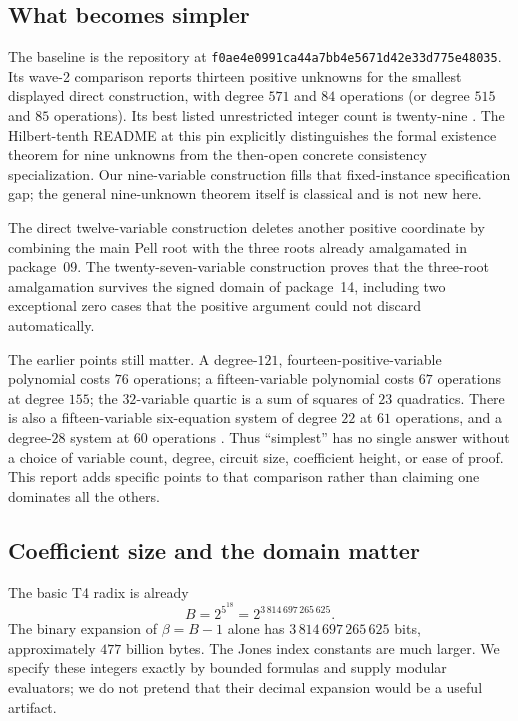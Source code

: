 \documentclass[11pt,a4paper]{article}
\theoremstyle{remark}
\newcommand{\pin}{\texttt{f0ae4e0991ca44a7bb4e5671d42e33d775e48035}}
\begin{document}
\subsection{What becomes simpler}

The baseline is the repository at \pin.  Its wave-2 comparison
\cite{collection} reports thirteen positive unknowns for the smallest
displayed direct construction, with degree $571$ and $84$ operations
(or degree $515$ and $85$ operations).  Its best listed unrestricted
integer count is twenty-nine \cite{integer29}.  The Hilbert-tenth README
at this pin explicitly distinguishes the formal existence theorem for
nine unknowns from the then-open concrete consistency specialization.
Our nine-variable construction fills that fixed-instance specification
gap; the general nine-unknown theorem itself is classical \cite{jones1982}
and is not new here.

The direct twelve-variable construction deletes another positive
coordinate by combining the main Pell root with the three roots already
amalgamated in package~09.  The twenty-seven-variable construction proves
that the three-root amalgamation survives the signed domain of
package~14, including two exceptional zero cases that the positive
argument could not discard automatically.

The earlier points still matter.  A degree-$121$, fourteen-positive-variable
polynomial costs $76$ operations; a fifteen-variable polynomial costs
$67$ operations at degree $155$; the $32$-variable quartic is a sum of
squares of $23$ quadratics.  There is also a fifteen-variable six-equation
system of degree $22$ at $61$ operations, and a degree-$28$ system at
$60$ operations \cite{collection}.  Thus ``simplest'' has no single
answer without a choice of variable count, degree, circuit size,
coefficient height, or ease of proof.  This report adds specific points
to that comparison rather than claiming one dominates all the others.

\subsection{Coefficient size and the domain matter}

The basic T4 radix is already
\[
 B=2^{5^{18}}=2^{3\,814\,697\,265\,625}.
\]
The binary expansion of $\beta=B-1$ alone has
$3\,814\,697\,265\,625$ bits, approximately $477$ billion bytes.
The Jones index constants are much larger.  We specify these integers
exactly by bounded formulas and supply modular evaluators; we do not
pretend that their decimal expansion would be a useful artifact.
\end{document}

